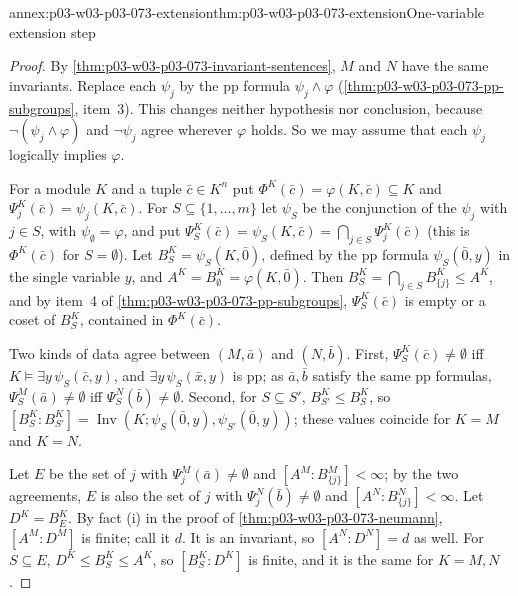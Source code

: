 \begin{annexitem}{annex:p03-w03-p03-073-extension}{thm:p03-w03-p03-073-extension}{One-variable extension step}
\begin{proof}
By \cref{thm:p03-w03-p03-073-invariant-sentences}, \(M\) and \(N\) have
the same invariants. Replace each \(\psi_j\) by the pp formula
\(\psi_j\wedge\varphi\) (\cref{thm:p03-w03-p03-073-pp-subgroups}, item~3).
This changes neither hypothesis nor conclusion, because
\(\neg(\psi_j\wedge\varphi)\) and \(\neg\psi_j\) agree wherever \(\varphi\)
holds. So we may assume that each \(\psi_j\) logically implies \(\varphi\).

For a module \(K\) and a tuple \(\bar c\in K^n\) put
\(\Phi^K(\bar c)=\varphi(K,\bar c)\subseteq K\) and
\(\Psi_j^K(\bar c)=\psi_j(K,\bar c)\). For
\(S\subseteq\{1,\ldots,m\}\) let \(\psi_S\) be the conjunction of the
\(\psi_j\) with \(j\in S\), with \(\psi_\emptyset=\varphi\), and put
\(\Psi_S^K(\bar c)=\psi_S(K,\bar c)=\bigcap_{j\in S}\Psi_j^K(\bar c)\)
(this is \(\Phi^K(\bar c)\) for \(S=\emptyset\)). Let
\(B_S^K=\psi_S(K,\bar 0)\), defined by the pp formula
\(\psi_S(\bar 0,y)\) in the single variable \(y\), and
\(A^K=B_\emptyset^K=\varphi(K,\bar0)\). Then
\(B_S^K=\bigcap_{j\in S}B_{\{j\}}^K\le A^K\), and by item~4 of
\cref{thm:p03-w03-p03-073-pp-subgroups}, \(\Psi_S^K(\bar c)\) is empty or
a coset of \(B_S^K\), contained in \(\Phi^K(\bar c)\).

Two kinds of data agree between \((M,\bar a)\) and \((N,\bar b)\).
First, \(\Psi_S^K(\bar c)\neq\emptyset\) iff \(K\models\exists
y\,\psi_S(\bar c,y)\), and \(\exists y\,\psi_S(\bar x,y)\) is pp; as
\(\bar a,\bar b\) satisfy the same pp formulas,
\(\Psi_S^M(\bar a)\neq\emptyset\) iff \(\Psi_S^N(\bar b)\neq\emptyset\).
Second, for \(S\subseteq S'\), \(B_{S'}^K\le B_S^K\), so
\([B_S^K:B_{S'}^K]=\operatorname{Inv}(K;\psi_S(\bar0,y),\psi_{S'}(\bar0,y))\);
these values coincide for \(K=M\) and \(K=N\).

Let \(E\) be the set of \(j\) with \(\Psi_j^M(\bar a)\neq\emptyset\) and
\([A^M:B_{\{j\}}^M]<\infty\); by the two agreements, \(E\) is also the
set of \(j\) with \(\Psi_j^N(\bar b)\neq\emptyset\) and
\([A^N:B_{\{j\}}^N]<\infty\). Let \(D^K=B_E^K\). By fact (i) in the proof
of \cref{thm:p03-w03-p03-073-neumann}, \([A^M:D^M]\) is finite; call it
\(d\). It is an invariant, so \([A^N:D^N]=d\) as well. For
\(S\subseteq E\), \(D^K\le B_S^K\le A^K\), so \([B_S^K:D^K]\) is finite,
and it is the same for \(K=M,N\).


\end{proof}
\end{annexitem}
